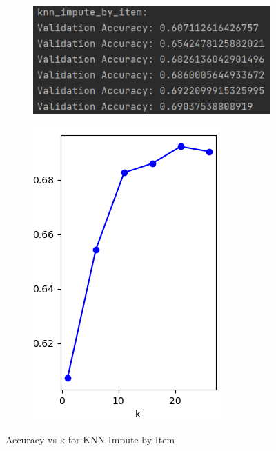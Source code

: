 \documentclass{article}
\begin{document}
\begin{figure}[H]
    \centering
    \begin{subfigure}{0.45\textwidth}
        \includegraphics[width=\textwidth]{knn_impute_by_item_result.png}
    \end{subfigure}
    \hfill
    \begin{subfigure}{0.35\textwidth}
        \includegraphics[width=\textwidth]{knn_impute_by_item_plot.png}
    \end{subfigure}
    \caption{Accuracy vs k for KNN Impute by Item}
\end{figure}
\end{document}
